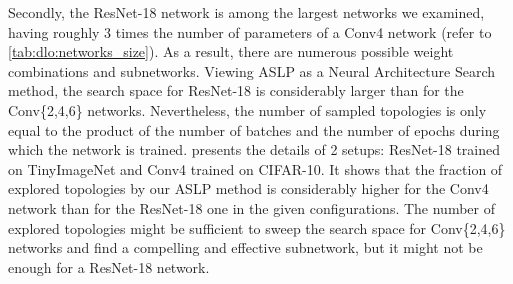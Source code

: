 Secondly, the ResNet-18 network is among the largest networks we examined,
having roughly 3 times the number of parameters of a Conv4 network (refer to
\cref{tab:dlo:networks_size}). As a result, there are numerous possible weight
combinations and subnetworks. Viewing \ac{ASLP} as a Neural Architecture Search
method, the search space for ResNet-18 is considerably larger than for the
Conv\{2,4,6\} networks. Nevertheless, the number of sampled topologies is only
equal to the product of the number of batches and the number of epochs during
which the network is trained.  presents
the details of 2 setups: ResNet-18 trained on TinyImageNet and Conv4 trained on
CIFAR-10. It shows that the fraction of explored topologies by our \ac{ASLP}
method is considerably higher for the Conv4 network than for the ResNet-18 one
in the given configurations. The number of explored topologies might be
sufficient to sweep the search space for Conv\{2,4,6\} networks and find a
compelling and effective subnetwork, but it might not be enough for a ResNet-18
network.\\

